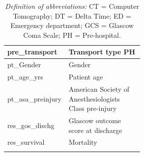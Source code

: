 \documentclass[12pt, a4paper]{article}
\begin{document}
\begin{appendices}
\begin{longtable}[c]{@{}|l|p{0.55\linewidth}|@{}}
        pre\_transport                              & Transport type PH                                                 \\\hline
        pt\_Gender                                  & Gender                                                            \\\hline
        pt\_age\_yrs                                & Patient age                                                       \\\hline
        pt\_asa\_preinjury                          & American Society of Anesthesiologists Class pre-injury            \\\hline
        res\_gos\_dischg                            & Glascow outcome score at discharge                                \\\hline
        res\_survival                               & Mortality                                                         \\\hline
        \caption*{\small \textit{Definition of abbreviations:} CT = Computer Tomography; DT = Delta Time; ED = Emergency department; GCS = Glascow Coma Scale; PH = Pre-hospital.}%
    \end{longtable}


\end{appendices}
\end{document}
